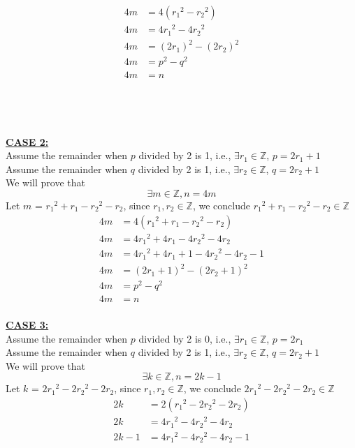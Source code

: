 \documentclass[20pt]{article}
\begin{document}
\begin{enumerate}
\begin{align*}
    4m &= 4({r_1}^2 - {r_2}^2)\\
    4m &= 4{r_1}^2 - 4{r_2}^2\\
    4m &= (2r_1)^2 - (2r_2)^2\\
    4m &= p^2 - q^2 \\
    4m &= n \tag{By assumption, $n = p^2 - q^2$}
\end{align*}\\\\\\\\
\underline{\textbf{CASE 2:}} \\
Assume the remainder when $p$ divided by 2 is 1, i.e., $\exists r_1 \in \mathbb{Z}$, $p = 2r_1 + 1$\\
Assume the remainder when $q$ divided by 2 is 1, i.e., $\exists r_2 \in \mathbb{Z}$, $q = 2r_2 + 1$\\
We will prove that 
\[\exists m \in\mathbb{Z}, n = 4m\]
Let $m$ = ${r_1}^2 + r_1 - {r_2}^2 - r_2$, since $r_1, r_2 \in \mathbb{Z}$, we conclude ${r_1}^2 + r_1 - {r_2}^2 - r_2 \in \mathbb{Z}$
\begin{align*}
    4m &= 4({r_1}^2 + r_1 - {r_2}^2 - r_2)\\
    4m &= 4{r_1}^2 + 4r_1 - 4{r_2}^2 - 4r_2\\
    4m &= 4{r_1}^2 + 4r_1 + 1 - 4{r_2}^2 - 4r_2 - 1\\
    4m &= (2r_1 + 1)^2 - (2r_2 + 1)^2 \\
    4m &= p^2 - q^2 \\
    4m &= n \tag{By assumption, $n = p^2 - q^2$}
\end{align*}\\
\underline{\textbf{CASE 3:}} \\
Assume the remainder when $p$ divided by 2 is 0, i.e., $\exists r_1 \in \mathbb{Z}$, $p = 2r_1$\\
Assume the remainder when $q$ divided by 2 is 1, i.e., $\exists r_2 \in \mathbb{Z}$, $q = 2r_2 + 1$\\
We will prove that 
\[\exists k \in\mathbb{Z}, n = 2k -1\]
Let $k$ = $2{r_1}^2 - 2{r_2}^2 - 2r_2$, since $r_1, r_2 \in \mathbb{Z}$, we conclude $2{r_1}^2 - 2{r_2}^2 - 2r_2 \in \mathbb{Z}$
\begin{align*}
    2k &= 2({r_1}^2 - 2{r_2}^2 - 2r_2)\\
    2k &= 4{r_1}^2 - 4{r_2}^2 - 4r_2\\
    2k - 1 &= 4{r_1}^2 - 4{r_2}^2 - 4r_2 - 1\\

\end{align*}
\end{enumerate}
\end{document}
